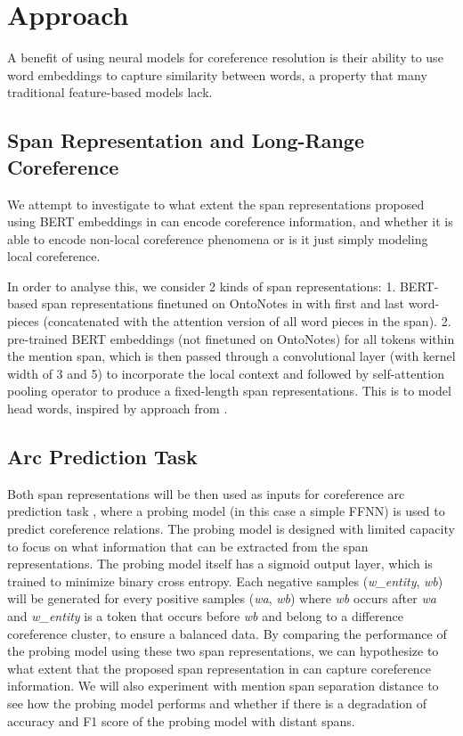 \documentclass[11pt]{article}
\begin{document}
\section{Approach}

A benefit of using neural models
for coreference resolution is their ability to use
word embeddings to capture similarity between
words, a property that many traditional feature-based models lack.


\subsection{Span Representation and Long-Range Coreference}

We attempt to investigate to what extent the span representations proposed using BERT \parencite{devlin2019bert} embeddings in \textcite{joshi2019coref} can encode coreference information, and whether it is able to encode non-local coreference phenomena or is it just simply modeling local coreference.

In order to analyse this, we consider 2 kinds of span representations:
1. BERT-based span representations finetuned on OntoNotes in \textcite{joshi2019coref} with first and last word-pieces (concatenated with the attention version of all word pieces in the span).
2. pre-trained BERT embeddings (not finetuned on OntoNotes) for all tokens within the mention span, which is then passed through a convolutional layer (with kernel width of 3 and 5) to incorporate the local context and followed by self-attention pooling operator to produce a fixed-length span representations. This is to model head words, inspired by approach from \textcite{tenney2019context}.

\subsection{Arc Prediction Task}

Both span representations will be then used as inputs for coreference arc prediction task \cite{liu2019linguistic}, where a probing model (in this case a simple FFNN) is used to predict coreference relations. The probing model is designed with limited capacity to focus on what information that can be extracted from the span representations. The probing model itself has a sigmoid output layer, which is trained to minimize binary cross entropy. Each negative samples (\textit{w\_entity}, \textit{wb}) will be generated for every positive samples (\textit{wa}, \textit{wb}) where \textit{wb} occurs after \textit{wa} and \textit{w\_entity} is a token that occurs before \textit{wb} and belong to a difference coreference cluster, to ensure a balanced data. By comparing the performance of the probing model using these two span representations, we can hypothesize to what extent that the proposed span representation in \textcite{joshi2019coref}  can capture coreference information. We will also experiment with mention span separation distance to see how the probing model performs and whether if there is a degradation of accuracy and F1 score of the probing model with distant spans.
\end{document}
